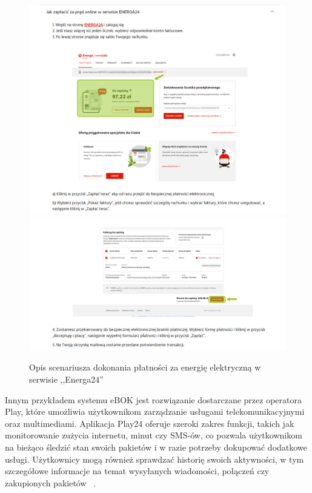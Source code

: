 \begin{figure}[htb]
	\centering
		\includegraphics[width=0.85\linewidth]{zrzuty_ekranu/energa_manual_1.png} \\[-1ex]
		\includegraphics[width=0.85\linewidth]{zrzuty_ekranu/energa_manual_2.png} \\[-1ex]
		\caption{Opis scenariusza dokonania płatności za energię elektryczną w serwisie ,,Energa24''~\cite{energa}}
	\label{fig:energa_manual}
\end{figure}

Innym przykładem systemu eBOK jest rozwiązanie dostarczane przez operatora Play, które umożliwia użytkownikom zarządzanie usługami telekomunikacyjnymi oraz multimediami. Aplikacja Play24 oferuje szeroki zakres funkcji, takich jak monitorowanie zużycia internetu, minut czy SMS-ów, co pozwala użytkownikom na bieżąco śledzić stan swoich pakietów i w razie potrzeby dokupować dodatkowe usługi. Użytkownicy mogą również sprawdzać historię swoich aktywności, w tym szczegółowe informacje na temat wysyłanych wiadomości, połączeń czy zakupionych pakietów ~\cite{Play24}.

